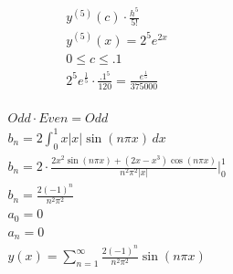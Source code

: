 \documentclass[12pt]{article}
\begin{document}
\hline
\begin{equation}
  \begin{split}
    y^{(5)}(c)\cdot\frac{h^5}{5!}\\
    y^{(5)}(x)=2^5e^{2x}\\
    0\leq c\leq .1\\
    2^5e^{\frac{1}{5}}\cdot\frac{.1^5}{120}=\frac{e^{\frac{1}{5}}}{375000}\\
  \end{split}
  \label{10}
\end{equation}
\hline

\begin{equation}
  \begin{split}
    Odd\cdot Even=Odd\\
    b_n=2\int_0^1 x|x|\sin\left( n\pi x \right)\,dx\\
    b_n=2\cdot\frac{2x^2\sin(n\pi x)+(2x-x^3)\cos(n\pi x)}{n^2\pi^2|x|}\Big|_0^1\\
    b_n=\frac{2(-1)^n}{n^2\pi^2}\\
    a_0=0\\
    a_n=0\\
    y(x)=\sum_{n=1}^{\infty}\frac{2(-1)^n}{n^2\pi^2}\sin(n\pi x)
  \end{split}
  \label{11}
\end{equation}
\hline
\end{document}

